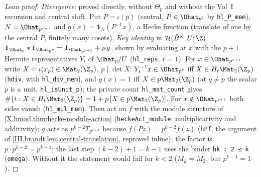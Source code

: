 \begin{proof}[Lean proof]
\emph{Divergence}: proved directly, without $\Theta_p$ and without the Vol~I recursion and central shift. Put $P=\iota(p)$ (central, $P\in\Ohat_{p^2}$ by \texttt{hl\_P\_mem}), $N=\Ohat_{p^{r-1}}$ and $g(x)=\mathbf 1_N(P^{-1}x)$, a Hecke function (translate of one by the central $P$, finitely many cosets). \emph{Key identity} in $\mathcal H(\hat B^\times,U;\Z)$: $\mathbf 1_{\Ohat_p}*\mathbf 1_{\Ohat_{p^r}}=\mathbf 1_{\Ohat_{p^{r+1}}}+p\,g$, shown by evaluating at $x$ with the $p+1$ Hermite representatives $Y_t$ of $\Ohat_p/U$ (\texttt{hl\_reps}, $r=1$). For $x\in\Ohat_{p^{r+1}}$ write $X=\iota(x_p)\in\Mat_2(\Z_p)$, $p\mid\det X$: $Y_t^{-1}x\in\Ohat_{p^r}$ iff $X\in H_t\Mat_2(\Z_p)$ (\texttt{hdiv}, with \texttt{hl\_div\_mem}), and $g(x)=1$ iff $X\in p\Mat_2(\Z_p)$ (at $q\neq p$ the scalar $p$ is a unit, \texttt{hl\_isUnit\_p}); the private count \texttt{hl\_mat\_count} gives $\#\{t:X\in H_t\Mat_2(\Z_p)\}=1+p\,[X\in p\Mat_2(\Z_p)]$. For $x\notin\Ohat_{p^{r+1}}$ both sides vanish (\texttt{hl\_mul\_mem}). Then act on $f$ with the module structure of \cref{X.hmod.thm:hecke-module-action} (\texttt{heckeAct\_module}: multiplicativity and additivity); $g$ acts as $p^{k-2}T_{p^{r-1}}$ because $f(Pz)=p^{k-2}f(z)$ (\texttt{hPf}, the argument of \cref{III.brandt.lem:central-translation}, reproved inline); the factor is $p\cdot p^{k-2}=p^{k-1}$; the last step $(k-2)+1=k-1$ uses the binder \texttt{hk : 2 ≤ k} (\texttt{omega}). Without it the statement would fail for $k<2$ ($M_k=M_2$, but $p^{k-1}=1$).
\end{proof}

